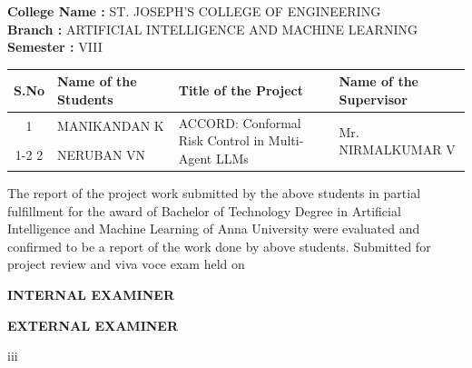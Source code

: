 \documentclass[12pt,a4paper]{report}
\begin{document}
\vspace{0.8cm}
\noindent\textbf{College Name :} ST. JOSEPH'S COLLEGE OF ENGINEERING\\[4pt]
\textbf{Branch :} ARTIFICIAL INTELLIGENCE AND MACHINE LEARNING\\[4pt]
\textbf{Semester :} VIII

\vspace{0.8cm}
\begin{table}[h]
\centering
\begin{tabular}{|c|p{4cm}|p{5cm}|p{4cm}|}
\hline
\textbf{S.No} & \textbf{Name of the Students} & \textbf{Title of the Project} & \textbf{Name of the Supervisor} \\ \hline
1 & MANIKANDAN K & \multirow{2}{5cm}{ACCORD: Conformal Risk Control in Multi-Agent LLMs} & \multirow{2}{4cm}{Mr. NIRMALKUMAR V} \\ \cline{1-2}
2 & NERUBAN VN & & \\ \hline
\end{tabular}
\end{table}

\vspace{0.8cm}
The report of the project work submitted by the above students in partial fulfillment for the award of Bachelor of Technology Degree in Artificial Intelligence and Machine Learning of Anna University were evaluated and confirmed to be a report of the work done by above students. Submitted for project review and viva voce exam held on \underline{\hspace{4cm}}

\vspace{3cm}
\noindent
\begin{minipage}[t]{0.45\textwidth}
\begin{center}
\textbf{INTERNAL EXAMINER}
\end{center}
\end{minipage}
\hfill
\begin{minipage}[t]{0.45\textwidth}
\begin{center}
\textbf{EXTERNAL EXAMINER}
\end{center}
\end{minipage}

\vspace{1cm}
\begin{center}
  iii
\end{center}

\end{document}
